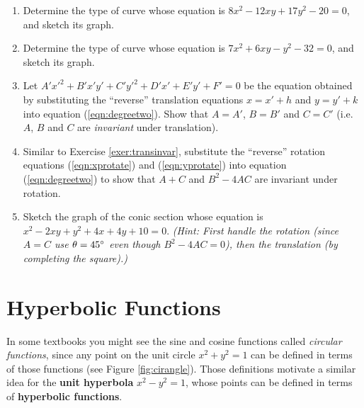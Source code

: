 {\begin{enumerate}[\bfseries 1.]
  \emph{(Hint: Use equations (\ref{eqn:xrotate}) and (\ref{eqn:yrotate}).)}
[{[\bfseries 1.]}]
 \item Determine the type of curve whose equation is $8x^2-12xy+17y^2-20=0$,
  and sketch its graph.
 \item Determine the type of curve whose equation is $7x^2+6xy-y^2-32=0$,
  and sketch its graph.
 \item\label{exer:transinvar} Let $A'x'^2+B'x'y'+C'y'^2+D'x'+E'y'+F'=0$ be the
  equation obtained by substituting the ``reverse'' translation equations
  $x=x'+h$ and $y=y'+k$ into equation (\ref{eqn:degreetwo}). Show that
  $A=A'$, $B=B'$ and $C=C'$ (i.e. $A$, $B$ and $C$ are \emph{invariant} under
  translation).
 \item Similar to Exercise \ref{exer:transinvar}, substitute the ``reverse''
  rotation equations (\ref{eqn:xprotate}) and (\ref{eqn:yprotate}) into equation
  (\ref{eqn:degreetwo}) to show that $A+C$ and $B^2-4AC$ are invariant under
  rotation.
 \item Sketch the graph of the conic section whose equation is
  $x^2-2xy+y^2+4x+4y+10=0$. \emph{(Hint: First handle the rotation (since $A=C$
  use $\theta=45^\circ$ even though $B^2-4AC=0$), then the translation (by
  completing the square).)}
\end{enumerate}
}
\newpage
\section{Hyperbolic Functions}
In some textbooks you might see the sine and cosine functions called
\emph{circular functions},
since any point on the unit circle $x^2+y^2=1$ can be defined in terms of those
functions (see Figure \ref{fig:cirangle}). Those definitions motivate a similar
idea for the \textbf{unit hyperbola} $x^2-y^2=1$, whose
points can be defined in terms of \textbf{hyperbolic
functions}.

